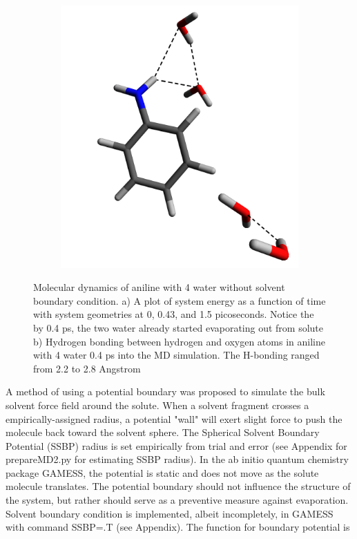 \documentclass[
journal=jpcbfk, %
manuscript=article]{achemso}
\begin{document}
	\begin{figure}[!htb]
		\centering
		\begin{subfigure}[b]{0.58\textwidth}
			\caption{}
			\label{fig:aniline4a)}
		\end{subfigure}
		\hfill
		\begin{subfigure}[b]{0.40\textwidth}
			\includegraphics[width=1\textwidth]{images/aniline4_430_hBond.png}
			\caption{}
			\label{fig:aniline4b)}
		\end{subfigure}
		\caption{Molecular dynamics of aniline with 4 water without solvent boundary condition. a) A plot of system energy as a function of time with system geometries at 0, 0.43, and 1.5 picoseconds. Notice the by 0.4 ps, the two water already started evaporating out from solute b) Hydrogen bonding between hydrogen and oxygen atoms in aniline with 4 water 0.4 ps into the MD simulation. The H-bonding  ranged from 2.2 to 2.8 Angstrom}
	\end{figure}	
	A method of using a potential boundary was proposed to simulate the bulk solvent force field around the solute.\cite{Beglov1994} When a solvent fragment crosses a empirically-assigned radius, a potential "wall" will exert slight force to push the molecule back toward the solvent sphere. The Spherical Solvent Boundary Potential (SSBP) radius is set empirically from trial and error (see Appendix for prepareMD2.py for estimating SSBP radius). In the ab initio quantum chemistry package GAMESS\cite{Schmidt1993}, the potential is static and does not move as the solute molecule translates. The potential boundary should not influence the structure of the system, but rather should serve as a preventive measure against evaporation. Solvent boundary condition is implemented, albeit incompletely, in GAMESS with command SSBP=.T (see Appendix). The function for boundary potential is 
\end{document}
